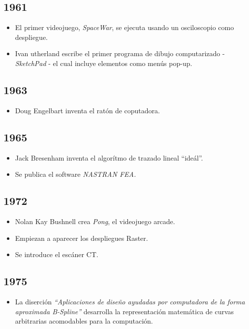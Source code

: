 \documentclass[letterpaper, 12pt]{article}
\begin{document}
\begin{justify}
        \subsection*{1961}
        \begin{itemize}
            \item El primer videojuego, \emph{SpaceWar}, se ejecuta usando un osciloscopio como despliegue.
            \item Ivan utherland escribe el primer programa de dibujo computarizado - \emph{SketchPad} - el cual incluye elementos como menús pop-up.
        \end{itemize}
        \subsection*{1963}
        \begin{itemize}
            \item Doug Engelbart inventa el ratón de coputadora.
        \end{itemize}
        \subsection*{1965}
        \begin{itemize}
            \item Jack Bresenham inventa el algorítmo de trazado lineal ``ideál''.
            \item Se publica el software \emph{NASTRAN FEA.}
        \end{itemize}
        \subsection*{1972}
        \begin{itemize}
            \item Nolan Kay Bushnell crea \emph{Pong}, el videojuego arcade.
            \item Empiezan a aparecer los despliegues Raster.
            \item Se introduce el escáner CT.
        \end{itemize}
        \subsection*{1975}
        \begin{itemize}
            \item La diserción \emph{``Aplicaciones de diseño ayudadas por computadora de la forma aproximada B-Spline''} desarrolla la representación matemática de curvas arbitrarias acomodables para la computación.
        \end{itemize}

\end{justify}
\end{document}
